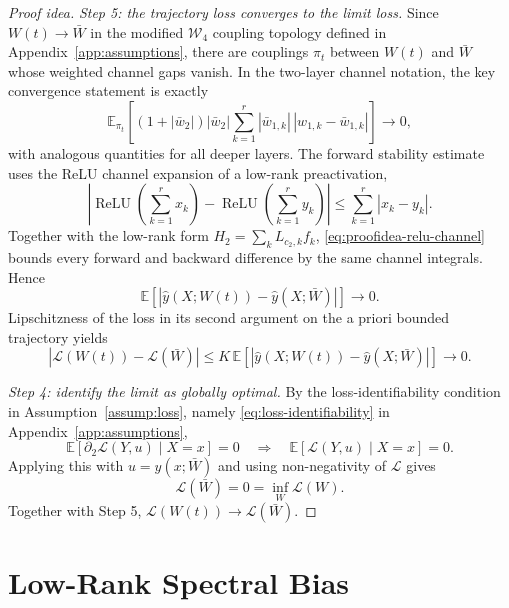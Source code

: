 \documentclass{article}
\newcommand{\E}{\mathbb{E}}
\newcommand{\calL}{\mathcal{L}}
\newcommand{\scrL}{\mathcal{L}}
\begin{document}
\begin{proof}[Proof idea]
\emph{Step 5: the trajectory loss converges to the limit loss.}
Since $W(t)\to\bar W$ in the modified $\mathcal W_4$ coupling topology defined in Appendix~\ref{app:assumptions}, there are couplings $\pi_t$ between $W(t)$ and $\bar W$ whose weighted channel gaps vanish. In the two-layer channel notation, the key convergence statement is exactly
\begin{equation}
\E_{\pi_t}\!\left[(1+|\bar w_2|)|\bar w_2|
\sum_{k=1}^r |\bar w_{1,k}|\,|w_{1,k}-\bar w_{1,k}|\right]\to0,
\end{equation}
with analogous quantities for all deeper layers. The forward stability estimate uses the ReLU channel expansion of a low-rank preactivation,
\begin{equation}
\left|\operatorname{ReLU}\!\left(\sum_{k=1}^r x_k\right)
-\operatorname{ReLU}\!\left(\sum_{k=1}^r y_k\right)\right|
\le \sum_{k=1}^r |x_k-y_k|.
\label{eq:proofidea-relu-channel}
\end{equation}
Together with the low-rank form $H_2=\sum_k L_{c_2,k}f_k$, \eqref{eq:proofidea-relu-channel} bounds every forward and backward difference by the same channel integrals. Hence
\begin{equation}
\E\left[
\left|\hat y(X;W(t))-\hat y(X;\bar W)\right|
\right]\to0.
\end{equation}
Lipschitzness of the loss in its second argument on the a priori bounded trajectory yields
\begin{equation}
|\scrL(W(t))-\scrL(\bar W)|
\le
K\,\E\left[
\left|\hat y(X;W(t))-\hat y(X;\bar W)\right|
\right]\to0.
\end{equation}

\emph{Step 4: identify the limit as globally optimal.}
By the loss-identifiability condition in Assumption~\ref{assump:loss}, namely \eqref{eq:loss-identifiability} in Appendix~\ref{app:assumptions},
\begin{equation}
\E[\partial_2\calL(Y,u)\mid X=x]=0
\quad\Longrightarrow\quad
\E[\calL(Y,u)\mid X=x]=0.
\end{equation}
Applying this with $u=\hat y(x;\bar W)$ and using non-negativity of $\calL$ gives
\begin{equation}
\scrL(\bar W)=0=\inf_W \scrL(W).
\end{equation}
Together with Step 5, $\scrL(W(t))\to\scrL(\bar W)$.
\end{proof}

\section{Low-Rank Spectral Bias}
\label{sec:spectral-transition}
\end{document}
